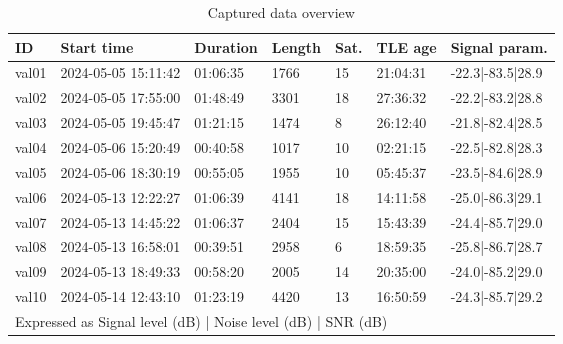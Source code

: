 \begin{table}
    \centering
    \begin{tabular}{lp{0.75in}lllll}
ID    & Start time          & Duration & Length & Sat. & TLE age   & Signal param.\sc{*}       \\\hline
val01 & 2024-05-05 15:11:42 & 01:06:35 & 1766   & 15     & 21:04:31  & -22.3|-83.5|28.9 \\
val02 & 2024-05-05 17:55:00 & 01:48:49 & 3301   & 18     & 27:36:32  & -22.2|-83.2|28.8 \\
val03 & 2024-05-05 19:45:47 & 01:21:15 & 1474   & 8      & 26:12:40  & -21.8|-82.4|28.5 \\
val04 & 2024-05-06 15:20:49 & 00:40:58 & 1017   & 10     & 02:21:15  & -22.5|-82.8|28.3 \\
val05 & 2024-05-06 18:30:19 & 00:55:05 & 1955   & 10     & 05:45:37  & -23.5|-84.6|28.9 \\
val06 & 2024-05-13 12:22:27 & 01:06:39 & 4141   & 18     & 14:11:58  & -25.0|-86.3|29.1 \\
val07 & 2024-05-13 14:45:22 & 01:06:37 & 2404   & 15     & 15:43:39  & -24.4|-85.7|29.0 \\
val08 & 2024-05-13 16:58:01 & 00:39:51 & 2958   & 6      & 18:59:35  & -25.8|-86.7|28.7 \\
val09 & 2024-05-13 18:49:33 & 00:58:20 & 2005   & 14     & 20:35:00  & -24.0|-85.2|29.0 \\
val10 & 2024-05-14 12:43:10 & 01:23:19 & 4420   & 13     & 16:50:59  & -24.3|-85.7|29.2 \\
\multicolumn{7}{l}{\sc{*}Expressed as Signal level (dB) | Noise level (dB) | SNR (dB)}
    \end{tabular}
    \caption{Captured data overview}
    \label{t_exp_data_overview}
\end{table}



